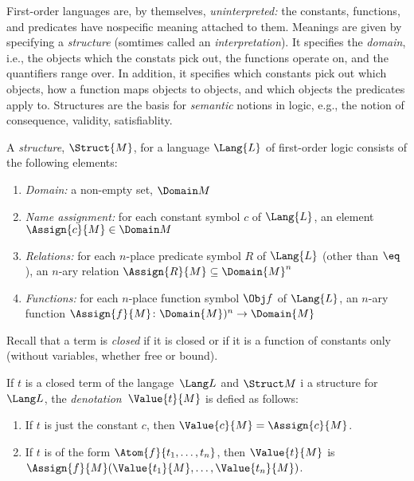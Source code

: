\documentclass[../../include/open-logic-section]{subfiles}
\begin{document}

\begin{explain}
First-order languages are, by themselves, \emph{uninterpreted:} the
constants, functions, and predicates have nospecific meaning attached
to them.  Meanings are given by specifying a \emph{structure}
(somtimes called an \emph{interpretation}).  It specifies the
\emph{domain}, i.e., the objects which the constats pick out, the
functions operate on, and the quantifiers range over. In addition, it
specifies which constants pick out which objects, how a function maps
objects to objects, and which objects the predicates apply to.
Structures are the basis for \emph{semantic} notions in logic, e.g.,
the notion of consequence, validity, satisfiablity.
\end{explain}

\begin{defn}[Structure]
A \emph{structure}, $\Struct{M}$, for a language $\Lang{L}$ of
first-order logic consists of the following elements:
\begin{enumerate}
\item \emph{Domain:} a non-empty set, $\Domain M$ 
\item \emph{Name assignment:} for each constant symbol $c$ of
  $\Lang{L}$, an element $\Assign{c}{M} \in \Domain M$
\item \emph{Relations:} for each $n$-place predicate symbol $R$ of
  $\Lang{L}$ (other than $\eq$), an $n$-ary relation $\Assign{R}{M}
  \subseteq \Domain{M}^n$
\item \emph{Functions:} for each $n$-place function symbol $\Obj f$ of
  $\Lang{L}$, an $n$-ary function $\Assign{f}{M} \colon
  \Domain{M})^n \to \Domain{M}$
  
\end{enumerate}
\end{defn}

\begin{explain}
Recall that a term is \emph{closed} if it is closed or if it is a
function of constants only (without variables, whether free or bound).
\end{explain}

\begin{defn}
If $t$ is a closed term of the langage~$\Lang L$ and $\Struct M$ i a
structure for~$\Lang L$, the \emph{denotation}~$\Value{t}{M}$ is
defied as follows:
\begin{enumerate}
\item If $t$ is just the constant $c$, then $\Value{c}{M} = \Assign{c}{M}$.
\item If $t$ is of the form $\Atom{f}{t_1, \ldots, t_n}$, then
  $\Value{t}{M}$ is $\Assign{f}{M}(\Value{t_1}{M}, \ldots,
  \Value{t_n}{M})$.
\end{enumerate}
\end{defn}
\end{document}
